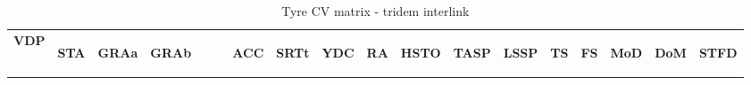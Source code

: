 \begin{table}[H]
\centering\scriptsize
\caption{Tyre CV matrix - tridem interlink}   
\label{table:tyre-cv-tridem-interlink}%
\begin{tabular}{|l|c|c|c|c|c|c|c|c|c|c|c|c|c|c|c|}

\hline
\multicolumn{1}{|c|}{\textbf{VDP}} & \begin{sideways}\textbf{STA}\end{sideways} & \begin{sideways}\textbf{GRAa}\end{sideways} & \begin{sideways}\textbf{GRAb~~~~}\end{sideways} & \begin{sideways}\textbf{ACC}\end{sideways} & \begin{sideways}\textbf{SRTt}\end{sideways} & \begin{sideways}\textbf{YDC}\end{sideways} & \begin{sideways}\textbf{RA}\end{sideways} & \begin{sideways}\textbf{HSTO}\end{sideways} & \begin{sideways}\textbf{TASP}\end{sideways} & \begin{sideways}\textbf{LSSP}\end{sideways} & \begin{sideways}\textbf{TS}\end{sideways} & \begin{sideways}\textbf{FS}\end{sideways} & \begin{sideways}\textbf{MoD}\end{sideways} & \begin{sideways}\textbf{DoM}\end{sideways} & \begin{sideways}\textbf{STFD}\end{sideways} \bigstrut \\


\end{tabular}
\end{table}
